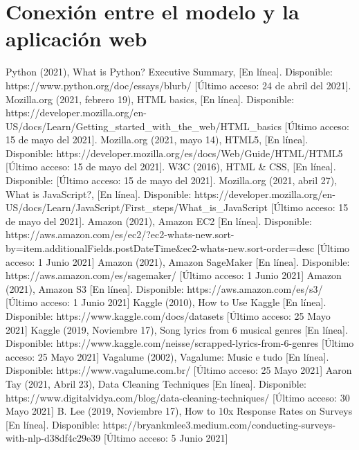 \documentclass[12pt, a4paper, titlepage]{article}
\begin{document}
	\section{Conexión entre el modelo y la aplicación web}
	\newpage
	\begin{thebibliography}{20}
		Python (2021), What is Python? Executive Summary, [En línea]. Disponible: https://www.python.org/doc/essays/blurb/ [Último acceso: 24 de abril del 2021].
		Mozilla.org (2021, febrero 19), HTML basics, [En línea]. Disponible: https://developer.mozilla.org/en-US/docs/Learn/Getting\_started\_with\_the\_web/HTML\_basics [Último acceso: 15 de mayo del 2021].
		Mozilla.org (2021, mayo 14), HTML5, [En línea]. Disponible: https://developer.mozilla.org/es/docs/Web/Guide/HTML/HTML5 [Último acceso: 15 de mayo del 2021].
		W3C (2016), HTML \& CSS, [En línea]. Disponible: [Último acceso: 15 de mayo del 2021].		
		Mozilla.org (2021, abril 27), What is JavaScript?, [En línea]. Disponible: https://developer.mozilla.org/en-US/docs/Learn/JavaScript/First\_steps/What\_is\_JavaScript [Último acceso: 15 de mayo del 2021].
		Amazon (2021), Amazon EC2 [En línea]. Disponible: https://aws.amazon.com/es/ec2/?ec2-whats-new.sort-by=item.additionalFields.postDateTime\&ec2-whats-new.sort-order=desc [Último acceso: 1 Junio 2021]		
		Amazon (2021), Amazon SageMaker [En línea]. Disponible: https://aws.amazon.com/es/sagemaker/ [Último acceso: 1 Junio 2021]		
		Amazon (2021), Amazon S3 [En línea]. Disponible: https://aws.amazon.com/es/s3/ [Último acceso: 1 Junio 2021]		
		Kaggle (2010), How to Use Kaggle [En línea]. Disponible: https://www.kaggle.com/docs/datasets [Último acceso: 25 Mayo 2021]
		Kaggle (2019, Noviembre 17), Song lyrics from 6 musical genres [En línea]. Disponible: https://www.kaggle.com/neisse/scrapped-lyrics-from-6-genres [Último acceso: 25 Mayo 2021]
		Vagalume (2002), Vagalume: Music e tudo [En línea]. Disponible: https://www.vagalume.com.br/ [Último acceso: 25 Mayo 2021]		
		Aaron Tay (2021, Abril 23), Data Cleaning Techniques [En línea]. Disponible: https://www.digitalvidya.com/blog/data-cleaning-techniques/ [Último acceso: 30 Mayo 2021]
		B. Lee (2019, Noviembre 17), How to 10x Response Rates on Surveys [En línea]. Disponible: https://bryankmlee3.medium.com/conducting-surveys-with-nlp-d38df4c29e39 [Último acceso: 5 Junio 2021]
		
	\end{thebibliography}	
\end{document}
